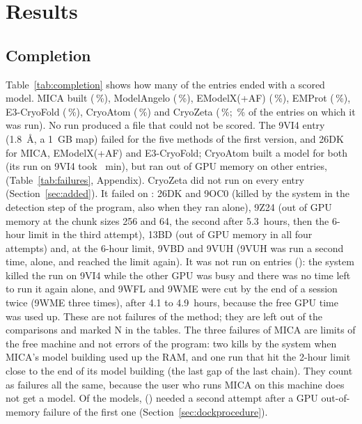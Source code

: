\section{Results}\label{sec:results}

\subsection{Completion}
Table~\ref{tab:completion} shows how many of the \NEntries{} entries ended with a scored model. MICA built \NModelMica{} (\CompListMica\,\%), ModelAngelo \NModelAngelo{} (\CompListAngelo\,\%), EModelX(+AF) \NModelEmodelx{} (\CompListEmodelx\,\%), EMProt \NModelEmprot{} (\CompListEmprot\,\%), E3-CryoFold \NModelEthree{} (\CompListEthree\,\%), CryoAtom \NModelCryoatom{} (\CompListCryoatom\,\%) and CryoZeta \NModelCryozeta{} (\CompListCryozeta\,\%; \CompAttCryozeta\,\% of the \NRanCryozeta{} entries on which it was run). No run produced a file that could not be scored. The 9VI4 entry (1.8~\AA{}, a 1~GB map) failed for the five methods of the first version, and 26DK for MICA, EModelX(+AF) and E3-CryoFold; CryoAtom built a model for both (its run on 9VI4 took \RtMaxCryoatom{}~min), but ran out of GPU memory on \NFailedCryoatom{} other entries, \FailCrashListCryoatom{} (Table~\ref{tab:failures}, Appendix). CryoZeta did not run on every entry (Section~\ref{sec:added}). It failed on \NFailedCryozeta{}: 26DK and 9OC0 (killed by the system in the detection step of the program, also when they ran alone), 9Z24 (out of GPU memory at the chunk sizes 256 and 64, the second after 5.3~hours, then the 6-hour limit in the third attempt), 13BD (out of GPU memory in all four attempts) and, at the 6-hour limit, 9VBD and 9VUH (9VUH was run a second time, alone, and reached the limit again). It was not run on \NNotRunCryozeta{} entries (\NotRunListCryozeta{}): the system killed the run on 9VI4 while the other GPU was busy and there was no time left to run it again alone, and 9WFL and 9WME were cut by the end of a session twice (9WME three times), after 4.1 to 4.9~hours, because the free GPU time was used up. These are not failures of the method; they are left out of the comparisons and marked N in the tables. The three failures of MICA are limits of the free machine and not errors of the program: two kills by the system when MICA's model building used up the RAM, and one run that hit the 2-hour limit close to the end of its model building (the last gap of the last chain). They count as failures all the same, because the user who runs MICA on this machine does not get a model. Of the \NModelMica{} models, \NRerunMica{} (\RerunMicaList{}) needed a second attempt after a GPU out-of-memory failure of the first one (Section~\ref{sec:dockprocedure}).

